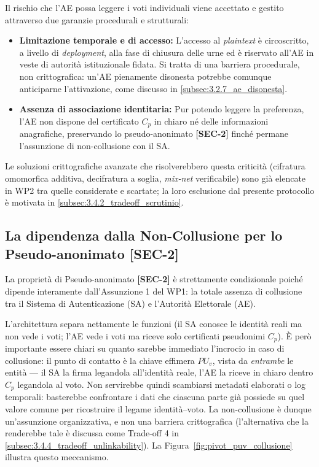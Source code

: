 Il rischio che l'AE possa leggere i voti individuali viene accettato e gestito attraverso due garanzie procedurali e strutturali:
\begin{itemize}
    \item \textbf{Limitazione temporale e di accesso:} L'accesso al \textit{plaintext} è circoscritto, a livello di \textit{deployment}, alla fase di chiusura delle urne ed è riservato all'AE in veste di autorità istituzionale fidata. Si tratta di una barriera procedurale, non crittografica: un'AE pienamente disonesta potrebbe comunque anticiparne l'attivazione, come discusso in \ref{subsec:3.2.7_ae_disonesta}.
    \item \textbf{Assenza di associazione identitaria:} Pur potendo leggere la preferenza, l'AE non dispone del certificato $C_p$ in chiaro né delle informazioni anagrafiche, preservando lo pseudo-anonimato \textbf{[SEC-2]} finché permane l'assunzione di non-collusione con il SA.
\end{itemize}
Le soluzioni crittografiche avanzate che risolverebbero questa criticità (cifratura omomorfica additiva, decifratura a soglia, \textit{mix-net} verificabile) sono già elencate in WP2 tra quelle considerate e scartate; la loro esclusione dal presente protocollo è motivata in \ref{subsec:3.4.2_tradeoff_scrutinio}.

\subsection{La dipendenza dalla Non-Collusione per lo Pseudo-anonimato [SEC-2]}
\label{subsec:3.3.5_vincolo_sec2}

La proprietà di Pseudo-anonimato \textbf{[SEC-2]} è strettamente condizionale poiché dipende interamente dall'Assunzione 1 del WP1: la totale assenza di collusione tra il Sistema di Autenticazione (SA) e l'Autorità Elettorale (AE).

L'architettura separa nettamente le funzioni (il SA conosce le identità reali ma non vede i voti; l'AE vede i voti ma riceve solo certificati pseudonimi $C_p$). È però importante essere chiari su quanto sarebbe immediato l'incrocio in caso di collusione: il punto di contatto è la chiave effimera $PU_v$, vista da \textit{entrambe} le entità --- il SA la firma legandola all'identità reale, l'AE la riceve in chiaro dentro $C_p$ legandola al voto. Non servirebbe quindi scambiarsi metadati elaborati o log temporali: basterebbe confrontare i dati che ciascuna parte già possiede su quel valore comune per ricostruire il legame identità--voto. La non-collusione è dunque un'assunzione organizzativa, e non una barriera crittografica (l'alternativa che la renderebbe tale è discussa come Trade-off 4 in \ref{subsec:3.4.4_tradeoff_unlinkability}). La Figura~\ref{fig:pivot_puv_collusione} illustra questo meccanismo.

